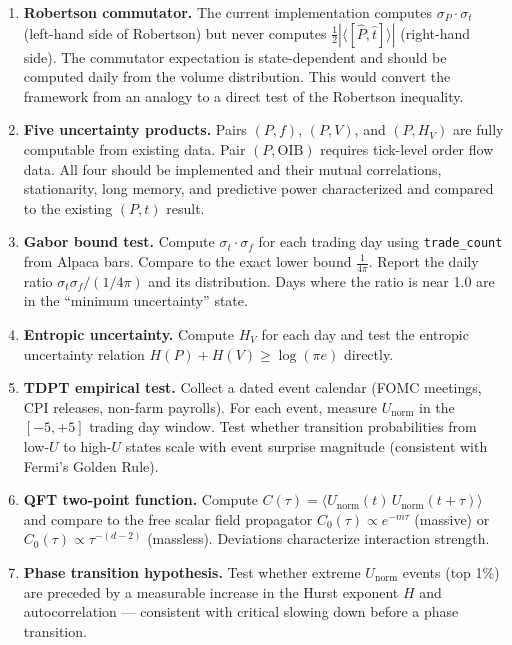 \documentclass[preprint,12pt]{elsarticle}
\begin{document}
\begin{enumerate}
    \item \textbf{Robertson commutator.} The current implementation computes $\sigma_P \cdot \sigma_t$ (left-hand side of Robertson) but never computes $\frac{1}{2}|\langle[\hat{P},\hat{t}]\rangle|$ (right-hand side). The commutator expectation is state-dependent and should be computed daily from the volume distribution. This would convert the framework from an analogy to a direct test of the Robertson inequality.

    \item \textbf{Five uncertainty products.} Pairs $(P,f)$, $(P,V)$, and $(P,H_V)$ are fully computable from existing data. Pair $(P,\mathrm{OIB})$ requires tick-level order flow data. All four should be implemented and their mutual correlations, stationarity, long memory, and predictive power characterized and compared to the existing $(P,t)$ result.

    \item \textbf{Gabor bound test.} Compute $\sigma_t \cdot \sigma_f$ for each trading day using \texttt{trade\_count} from Alpaca bars. Compare to the exact lower bound $\frac{1}{4\pi}$. Report the daily ratio $\sigma_t \sigma_f / (1/4\pi)$ and its distribution. Days where the ratio is near 1.0 are in the ``minimum uncertainty'' state.

    \item \textbf{Entropic uncertainty.} Compute $H_V$ for each day and test the entropic uncertainty relation $H(P) + H(V) \geq \log(\pi e)$ directly.

    \item \textbf{TDPT empirical test.} Collect a dated event calendar (FOMC meetings, CPI releases, non-farm payrolls). For each event, measure $U_\mathrm{norm}$ in the $[-5, +5]$ trading day window. Test whether transition probabilities from low-$U$ to high-$U$ states scale with event surprise magnitude (consistent with Fermi's Golden Rule).

    \item \textbf{QFT two-point function.} Compute $C(\tau) = \langle U_\mathrm{norm}(t)\, U_\mathrm{norm}(t+\tau)\rangle$ and compare to the free scalar field propagator $C_0(\tau) \propto e^{-m\tau}$ (massive) or $C_0(\tau) \propto \tau^{-(d-2)}$ (massless). Deviations characterize interaction strength.

    \item \textbf{Phase transition hypothesis.} Test whether extreme $U_\mathrm{norm}$ events (top 1\%) are preceded by a measurable increase in the Hurst exponent $H$ and autocorrelation --- consistent with critical slowing down before a phase transition.


\end{enumerate}
\end{document}
